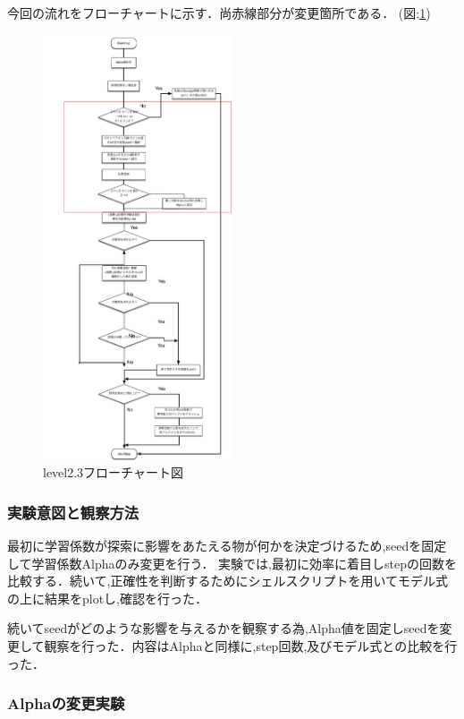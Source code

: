 今回の流れをフローチャートに示す．尚赤線部分が変更箇所である．
(図:\ref{fig:flow23})
\begin{figure}[H]
    \centering
    \includegraphics[width=0.5\textwidth]{figs/level2.3/flowchart3.pdf}
    \caption{level2.3フローチャート図}
\label{fig:flow23}
\end{figure}

\subsubsection{実験意図と観察方法}
最初に学習係数が探索に影響をあたえる物が何かを決定づけるため,seedを固定して学習係数Alphaのみ変更を行う．
実験では,最初に効率に着目しstepの回数を比較する．続いて,正確性を判断するためにシェルスクリプトを用いてモデル式の上に結果をplotし,確認を行った．

続いてseedがどのような影響を与えるかを観察する為,Alpha値を固定しseedを変更して観察を行った．内容はAlphaと同様に,step回数,及びモデル式との比較を行った．

\subsubsection{Alphaの変更実験}

